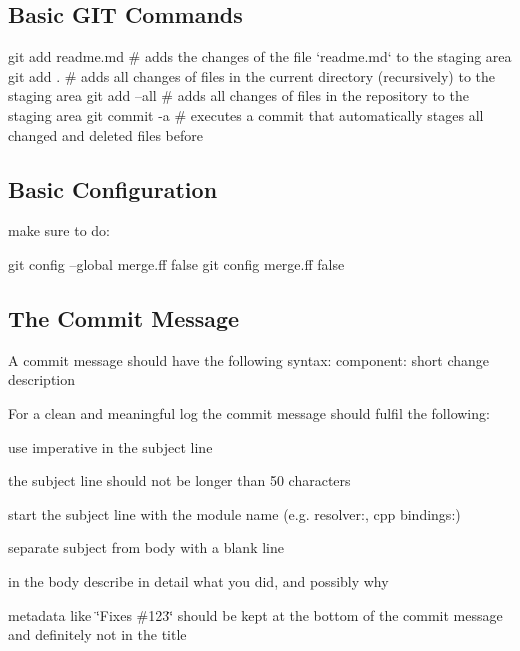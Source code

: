 \subsection*{Basic G\+IT Commands}


\begin{DoxyCode}
git add readme.md   # adds the changes of the file `readme.md` to the staging area
git add .           # adds all changes of files in the current directory (recursively) to the staging area
git add --all       # adds all changes of files in the repository to the staging area
git commit -a       # executes a commit that automatically stages all changed and deleted files before
\end{DoxyCode}


\subsection*{Basic Configuration}

make sure to do\+:


\begin{DoxyCode}
git config --global merge.ff false
git config merge.ff false
\end{DoxyCode}


\subsection*{The Commit Message}

A commit message should have the following syntax\+: {\ttfamily component\+: short change description}

For a clean and meaningful log the commit message should fulfil the following\+:


\begin{DoxyItemize}
\item use imperative in the subject line
\item the subject line should not be longer than 50 characters
\item start the subject line with the module name (e.\+g. resolver\+:, cpp bindings\+:)
\item separate subject from body with a blank line
\item in the body describe in detail what you did, and possibly why
\item metadata like \char`\"{}\+Fixes \#123\char`\"{} should be kept at the bottom of the commit message and definitely not in the title
\end{DoxyItemize}

